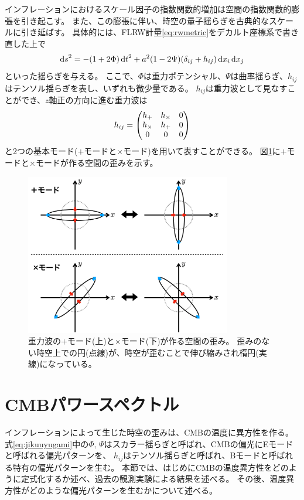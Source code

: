 \documentclass[../../main.tex]{subfiles}
\begin{document}
インフレーションにおけるスケール因子の指数関数的増加は空間の指数関数的膨張を引き起こす。
また、この膨張に伴い、時空の量子揺らぎを古典的なスケールに引き延ばす。
具体的には、FLRW計量\eqref{eq:rwmetric}をデカルト座標系で書き直した上で
\begin{equation}
    \label{eq:jikuuyugami}
    \dd{s}^2 = -\qty(1+2\Phi)\dd{t}^2 + a^2\qty(1-2\Psi)\qty(\delta_{ij}+h_{ij})\dd{x_i}\dd{x_j}
\end{equation}
といった揺らぎを与える。
ここで、$\Phi$は重力ポテンシャル、$\Psi$は曲率揺らぎ、$h_{ij}$はテンソル揺らぎを表し、いずれも微少量である。
$h_{ij}$は重力波として見なすことができ、$z$軸正の方向に進む重力波は
\begin{equation}
    h_{ij} = \mqty(h_{+} & h_{\times} & 0\\
                   h_{\times} & h_{+} & 0\\
                   0 & 0 & 0
                   )
\end{equation}
と2つの基本モード($+$モードと$\times$モード)を用いて表すことができる。
図\ref{fig:gravitational_wave}に$+$モードと$\times$モードが作る空間の歪みを示す。
\begin{figure}[H]
    \centering
    \includegraphics[width=0.8\textwidth]{intro/gravitational_wave.pdf}
    \caption{重力波の$+$モード(上)と$\times$モード(下)が作る空間の歪み。
    歪みのない時空上での円(点線)が、時空が歪むことで伸び縮みされ楕円(実線)になっている。}
    \label{fig:gravitational_wave}
\end{figure}

\section{CMBパワースペクトル}
インフレーションによって生じた時空の歪みは、CMBの温度に異方性を作る\cite{1967ApJ...147...73S}。
式\eqref{eq:jikuuyugami}中の$\Phi,\,\Psi$はスカラー揺らぎと呼ばれ、CMBの偏光にEモードと呼ばれる偏光パターンを、
$h_{ij}$はテンソル揺らぎと呼ばれ、Bモードと呼ばれる特有の偏光パターンを生む。
本節では、はじめにCMBの温度異方性をどのように定式化するか述べ、過去の観測実験による結果を述べる。
その後、温度異方性がどのような偏光パターンを生むかについて述べる。
\end{document}
